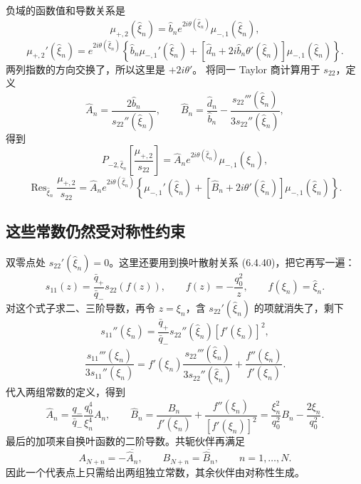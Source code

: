 \documentclass[lang=cn,scheme=chinese,mode=simple,device=normal,color=blue,math=cm,thmcnt=section,12pt]{elegantbook}
\DeclareMathOperator*{\Res}{Res}
\newcommand{\eqq}[2]{\tag{#1}\label{eq:#1}#2}
\begin{document}
负域的函数值和导数关系是
\begin{equation}\eqq{6.9.4}{\mu_{+,2}(\widehat\xi_n)
=\widehat b_ne^{2i\theta(\widehat\xi_n)}\mu_{-,1}(\widehat\xi_n),}\end{equation}
\begin{equation}\eqq{6.9.5}{\mu_{+,2}'(\widehat\xi_n)
=e^{2i\theta(\widehat\xi_n)}
\left\{\widehat b_n\mu_{-,1}'(\widehat\xi_n)
+[\widehat d_n+2i\widehat b_n\theta'(\widehat\xi_n)]\mu_{-,1}(\widehat\xi_n)\right\}.}\end{equation}
两列指数的方向交换了，所以这里是 $+2i\theta'$。
将同一 Taylor 商计算用于 $s_{22}$，定义
\[
\widehat A_n=\dfrac{2\widehat b_n}{s_{22}''(\widehat\xi_n)},\qquad
\widehat B_n=\dfrac{\widehat d_n}{\widehat b_n}
-\dfrac{s_{22}'''(\widehat\xi_n)}{3s_{22}''(\widehat\xi_n)},
\]
得到
\begin{equation}\eqq{6.9.8}{P_{-2,\widehat\xi_n}
\left[\dfrac{\mu_{+,2}}{s_{22}}\right]
=\widehat A_ne^{2i\theta(\widehat\xi_n)}\mu_{-,1}(\widehat\xi_n),}\end{equation}
\begin{equation}\eqq{6.9.9}{\Res_{\widehat\xi_n}\dfrac{\mu_{+,2}}{s_{22}}
=\widehat A_ne^{2i\theta(\widehat\xi_n)}
\left\{\mu_{-,1}'(\widehat\xi_n)
+[\widehat B_n+2i\theta'(\widehat\xi_n)]\mu_{-,1}(\widehat\xi_n)\right\}.}\end{equation}

\subsection*{这些常数仍然受对称性约束}
双零点处 $s_{22}'(\widehat\xi_n)=0$。这里还要用到换叶散射关系 (6.4.40)，把它再写一遍：
\[
s_{11}(z)=\dfrac{\bar q_+}{\bar q_-}s_{22}(f(z)),
\qquad f(z)=-\dfrac{q_0^2}{z},\qquad f(\xi_n)=\widehat\xi_n.
\]
对这个式子求二、三阶导数，再令 $z=\xi_n$，含 $s_{22}'(\widehat\xi_n)$ 的项就消失了，剩下
\[
s_{11}''(\xi_n)=\dfrac{\bar q_+}{\bar q_-}
s_{22}''(\widehat\xi_n)[f'(\xi_n)]^2,
\]
\[
\dfrac{s_{11}'''(\xi_n)}{3s_{11}''(\xi_n)}
=f'(\xi_n)\dfrac{s_{22}'''(\widehat\xi_n)}{3s_{22}''(\widehat\xi_n)}
+\dfrac{f''(\xi_n)}{f'(\xi_n)}.
\]
代入两组常数的定义，得到
\[
\widehat A_n=\dfrac{q_-}{\bar q_-}\dfrac{q_0^4}{\xi_n^4}A_n,\qquad
\widehat B_n=\dfrac{B_n}{f'(\xi_n)}
+\dfrac{f''(\xi_n)}{[f'(\xi_n)]^2}
=\dfrac{\xi_n^2}{q_0^2}B_n-\dfrac{2\xi_n}{q_0^2}.
\]
最后的加项来自换叶函数的二阶导数。共轭伙伴再满足
\[
A_{N+n}=-\overline{\widehat A_n},\qquad
B_{N+n}=\overline{\widehat B_n},\qquad n=1,\ldots,N.
\]
因此一个代表点上只需给出两组独立常数，其余伙伴由对称性生成。
\end{document}
